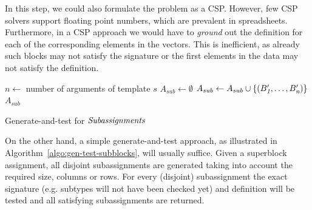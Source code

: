 In this step, we could also formulate the problem as a CSP. %
However, few CSP solvers support floating point numbers, which are prevalent in spreadsheets.
Furthermore, in a CSP approach we would have to \textit{ground} out the definition for each of the corresponding elements in the vectors.
This is inefficient, as already such blocks may not satisfy the signature or the first elements in the data may not satisfy the definition.

\begin{algorithm}[tbh]
  \begin{algorithmic}
    \footnotesize
    \State $n \gets$ number of arguments of template $s$
    \State $A_{sub} \gets \emptyset$
        \State $A_{sub} \gets A_{sub} \cup \{ (B_{\textit{1}}', \dots, B_{\textit{n}}') \}$
      \EndIf
    \EndFor
\Return $A_{sub}$
\EndProcedure
\end{algorithmic}
\caption{Generate-and-test for $\textit{Subassignments}$}
\label{algo:gen-test-subblocks}
\end{algorithm}


On the other hand, a simple generate-and-test approach, as illustrated in Algorithm~\ref{algo:gen-test-subblocks}, will usually suffice.
Given a superblock assignment, all disjoint subassignments are generated taking into account the required size, columns or rows.
For every (disjoint) subassignment the exact signature (e.g. subtypes will not have been checked yet) and definition will be tested and all satisfying subassignments are returned.





